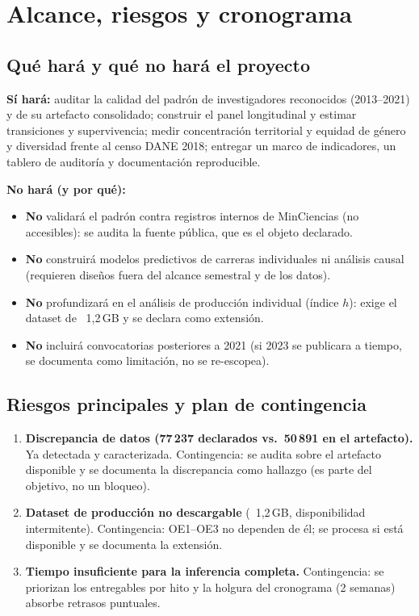 \section{Alcance, riesgos y cronograma}

\subsection{Qué hará y qué no hará el proyecto}

\textbf{Sí hará:} auditar la calidad del padrón de investigadores reconocidos
(2013--2021) y de su artefacto consolidado; construir el panel longitudinal y
estimar transiciones y supervivencia; medir concentración territorial y
equidad de género y diversidad frente al censo DANE 2018; entregar un marco de
indicadores, un tablero de auditoría y documentación reproducible.

\textbf{No hará (y por qué):}
\begin{itemize}
  \item \textbf{No} validará el padrón contra registros internos de MinCiencias
        (no accesibles): se audita la fuente pública, que es el objeto
        declarado.
  \item \textbf{No} construirá modelos predictivos de carreras individuales ni
        análisis causal (requieren diseños fuera del alcance semestral y de los
        datos).
  \item \textbf{No} profundizará en el análisis de producción individual
        (índice $h$): exige el dataset de ~1,2\,GB y se declara como extensión.
  \item \textbf{No} incluirá convocatorias posteriores a 2021 (si 2023 se
        publicara a tiempo, se documenta como limitación, no se re-escopea).
\end{itemize}

\subsection{Riesgos principales y plan de contingencia}

\begin{enumerate}
  \item \textbf{Discrepancia de datos (77\,237 declarados vs.\ 50\,891 en el
        artefacto).} Ya detectada y caracterizada. Contingencia: se audita
        sobre el artefacto disponible y se documenta la discrepancia como
        hallazgo (es parte del objetivo, no un bloqueo).
  \item \textbf{Dataset de producción no descargable} (~1,2\,GB, disponibilidad
        intermitente). Contingencia: OE1--OE3 no dependen de él; se procesa si
        está disponible y se documenta la extensión.
  \item \textbf{Tiempo insuficiente para la inferencia completa.} Contingencia:
        se priorizan los entregables por hito y la holgura del cronograma (2
        semanas) absorbe retrasos puntuales.
\end{enumerate}

